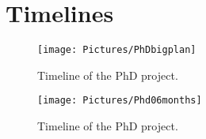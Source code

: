 \documentclass[]{scrreprt}
\begin{document}
\appendix
\section*{Timelines}
\begin{sidewaysfigure}[h!]
	\centering
	\texttt{[image: Pictures/PhDbigplan]}
	\caption{Timeline of the PhD project.}
	\label{fig:gantt}
\end{sidewaysfigure}
\begin{sidewaysfigure}[h!]
	\centering
	\texttt{[image: Pictures/Phd06months]}
	\caption{Timeline of the PhD project.}
	\label{fig:Phd06months}
\end{sidewaysfigure}
	\newpage
	{}
	
	
\end{document}

